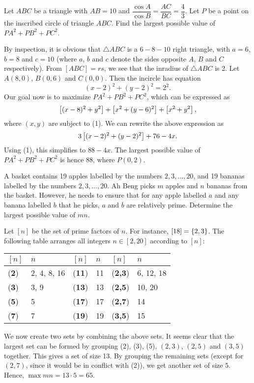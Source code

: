 \begin{question}[88]\label{Q::2021-O-1-18}
    Let $ABC$ be a triangle with $AB = 10$ and $\dfrac{\cos A}{\cos B} = \dfrac{AC}{BC} = \dfrac43$. Let $P$ be a point on the inscribed circle of triangle $ABC$. Find the largest possible value of $PA^2 + PB^2 + PC^2$.
\end{question}
\begin{solution*}
    By inspection, it is obvious that $\triangle ABC$ is a $6-8-10$ right triangle, with $a = 6$, $b = 8$ and $c = 10$ (where $a$, $b$ and $c$ denote the sides opposite $A$, $B$ and $C$ respectively). From $[ABC] = rs$, we see that the inradius of $\triangle ABC$ is 2. Let $A(8, 0)$, $B(0, 6)$ and $C(0, 0)$. Then the incircle has equation \[(x-2)^2 + (y-2)^2 = 2^2. \tag{1}\] Our goal now is to maximize $PA^2 + PB^2 + PC^2$, which can be expressed as \[\left[ (x-8)^2 + y^2 \right] + \left[ x^2 + (y-6)^2 \right] + \left[ x^2 + y^2 \right],\] where $(x, y)$ are subject to (1). We can rewrite the above expression as \[3\left[ (x-2)^2 + (y-2)^2 \right] + 76 - 4x.\] Using (1), this simplifies to $88 - 4x$. The largest possible value of $PA^2 + PB^2 + PC^2$ is hence 88, where $P(0, 2)$.
\end{solution*}

\begin{question}[65]\label{Q::2021-O-1-19}
    A basket contains 19 apples labelled by the numbers $2, 3, \ldots, 20$, and 19 bananas labelled by the numbers $2, 3, \ldots, 20$. Ah Beng picks $m$ apples and $n$ bananas from the basket. However, he needs to ensure that for any apple labelled $a$ and any banana labelled $b$ that he picks, $a$ and $b$ are relatively prime. Determine the largest possible value of $mn$.
\end{question}
\begin{solution*}
    Let $[n]$ be the set of prime factors of $n$. For instance, $[18] = \left\lbrace 2, 3 \right\rbrace$. The following table arranges all integers $n \in [2, 20]$ according to $[n]$:
    \begin{table}[h]
        \centering
        \begin{tabular}{|l|l|l|l|l|l|}
        \hline
        $[n]$ & $n$ & $[n]$ & $n$ & $[n]$ & $n$ \\ \hline
        (\textbf{2}) & 2, 4, 8, 16 & (\textbf{11}) & 11 & (\textbf{2,3}) & 6, 12, 18 \\ \hline
        (\textbf{3}) & 3, 9 & (\textbf{13}) & 13 & (\textbf{2,5}) & 10, 20 \\ \hline
        (\textbf{5}) & 5 & (\textbf{17}) & 17 & (\textbf{2,7}) & 14 \\ \hline
        (\textbf{7}) & 7 & (\textbf{19}) & 19 & (\textbf{3,5}) & 15 \\ \hline
        \end{tabular}
    \end{table}
    
    We now create two sets by combining the above sets. It seems clear that the largest set can be formed by grouping (2), (3), (5), $(2, 3)$, $(2, 5)$ and $(3, 5)$ together. This gives a set of size 13. By grouping the remaining sets (except for $(2, 7)$, since it would be in conflict with (2)), we get another set of size $5$. Hence, $\max mn = 13 \cdot 5 = 65$.
\end{solution*}

